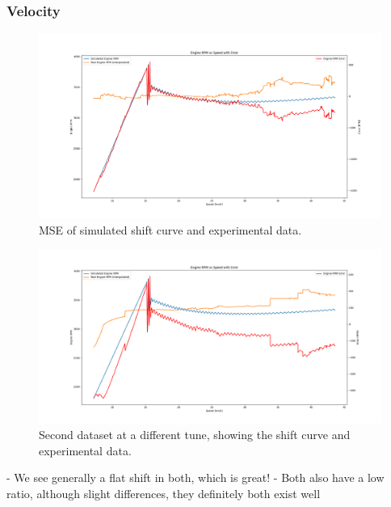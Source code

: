 \documentclass[12pt, titlepage]{article}
\begin{document}
\subsubsection{Velocity}

\begin{figure}[H]
  \begin{center}
   \includegraphics[width=\textwidth]{MSE Graphs/shift_curve_3400rpm.png}
  \caption{MSE of simulated shift curve and experimental data.}
  \label{Fig_Shift_3400} 
  \end{center}
\end{figure}

\begin{figure}[H]
  \begin{center}
   \includegraphics[width=\textwidth]{MSE Graphs/shift_curve_low_ratio.png}
  \caption{Second dataset at a different tune, showing the shift curve and experimental data.}
  \label{Fig_Shift_Low_Ratio} 
  \end{center}
\end{figure}

- We see generally a flat shift in both, which is great!
- Both also have a low ratio, although slight differences, they definitely both exist well
\end{document}
